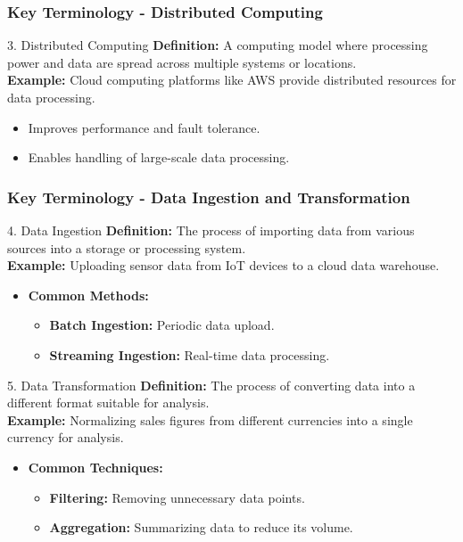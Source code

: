 \documentclass[aspectratio=169]{beamer}
\begin{document}
\begin{frame}[fragile]
    \frametitle{Key Terminology - Distributed Computing}
    \begin{block}{3. Distributed Computing}
        \textbf{Definition:} A computing model where processing power and data are spread across multiple systems or locations. \\
        \textbf{Example:} Cloud computing platforms like AWS provide distributed resources for data processing.
    \end{block}

    \begin{itemize}
        \item Improves performance and fault tolerance.
        \item Enables handling of large-scale data processing.
    \end{itemize}
\end{frame}

\begin{frame}[fragile]
    \frametitle{Key Terminology - Data Ingestion and Transformation}
    \begin{block}{4. Data Ingestion}
        \textbf{Definition:} The process of importing data from various sources into a storage or processing system. \\
        \textbf{Example:} Uploading sensor data from IoT devices to a cloud data warehouse.
    \end{block}
    
    \begin{itemize}
        \item \textbf{Common Methods:}
            \begin{itemize}
                \item \textbf{Batch Ingestion:} Periodic data upload.
                \item \textbf{Streaming Ingestion:} Real-time data processing.
            \end{itemize}
    \end{itemize}
    
    \begin{block}{5. Data Transformation}
        \textbf{Definition:} The process of converting data into a different format suitable for analysis. \\
        \textbf{Example:} Normalizing sales figures from different currencies into a single currency for analysis.
    \end{block}
    
    \begin{itemize}
        \item \textbf{Common Techniques:}
            \begin{itemize}
                \item \textbf{Filtering:} Removing unnecessary data points.
                \item \textbf{Aggregation:} Summarizing data to reduce its volume.
            \end{itemize}
    \end{itemize}
\end{frame}
\end{document}
